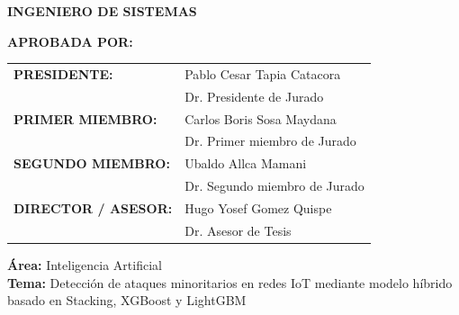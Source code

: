 \begin{center}
    \MakeUppercase{\fontsize{12pt}{1pt}\selectfont\textbf{Ingeniero de Sistemas}}
\end{center}

\begin{flushleft}
    \fontsize{11pt}{1pt}\selectfont\textbf{APROBADA POR:}
\end{flushleft}

\begin{flushleft}
\begin{tabular}{p{4.5cm} p{10cm}}
    \textbf{PRESIDENTE:} & Pablo Cesar Tapia Catacora \\
                           & Dr. Presidente de Jurado \\[0.5cm]
    \textbf{PRIMER MIEMBRO:} & Carlos Boris Sosa Maydana \\
                              & Dr. Primer miembro de Jurado \\[0.5cm]
    \textbf{SEGUNDO MIEMBRO:} & Ubaldo Allca Mamani \\
                               & Dr. Segundo miembro de Jurado \\[0.5cm]
    \textbf{DIRECTOR / ASESOR:} & Hugo Yosef Gomez Quispe \\
                                 & Dr. Asesor de Tesis \\
\end{tabular}
\end{flushleft}

\begin{flushleft}
\textbf{Área:} \hspace{0.5cm} Inteligencia Artificial \\[0.3cm]
\textbf{Tema:} \hspace{0.5cm} Detección de ataques minoritarios en redes IoT mediante modelo híbrido basado en Stacking, XGBoost y LightGBM
\end{flushleft}

\vfill